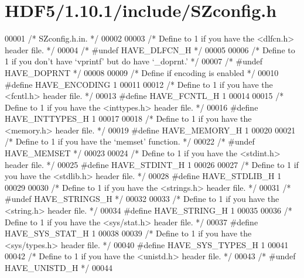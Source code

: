 \hypertarget{_h_d_f5_21_810_81_2include_2_s_zconfig_8h_source}{}\section{H\+D\+F5/1.10.1/include/\+S\+Zconfig.h}
\label{_h_d_f5_21_810_81_2include_2_s_zconfig_8h_source}

\begin{DoxyCode}
00001 \textcolor{comment}{/* SZconfig.h.in.  */}
00002 
00003 \textcolor{comment}{/* Define to 1 if you have the <dlfcn.h> header file. */}
00004 \textcolor{comment}{/* #undef HAVE\_DLFCN\_H */}
00005 
00006 \textcolor{comment}{/* Define to 1 if you don't have `vprintf' but do have `\_doprnt.' */}
00007 \textcolor{comment}{/* #undef HAVE\_DOPRNT */}
00008 
00009 \textcolor{comment}{/* Define if encoding is enabled */}
00010 \textcolor{preprocessor}{#define HAVE\_ENCODING 1}
00011 
00012 \textcolor{comment}{/* Define to 1 if you have the <fcntl.h> header file. */}
00013 \textcolor{preprocessor}{#define HAVE\_FCNTL\_H 1}
00014 
00015 \textcolor{comment}{/* Define to 1 if you have the <inttypes.h> header file. */}
00016 \textcolor{preprocessor}{#define HAVE\_INTTYPES\_H 1}
00017 
00018 \textcolor{comment}{/* Define to 1 if you have the <memory.h> header file. */}
00019 \textcolor{preprocessor}{#define HAVE\_MEMORY\_H 1}
00020 
00021 \textcolor{comment}{/* Define to 1 if you have the `memset' function. */}
00022 \textcolor{comment}{/* #undef HAVE\_MEMSET */}
00023 
00024 \textcolor{comment}{/* Define to 1 if you have the <stdint.h> header file. */}
00025 \textcolor{preprocessor}{#define HAVE\_STDINT\_H 1}
00026 
00027 \textcolor{comment}{/* Define to 1 if you have the <stdlib.h> header file. */}
00028 \textcolor{preprocessor}{#define HAVE\_STDLIB\_H 1}
00029 
00030 \textcolor{comment}{/* Define to 1 if you have the <strings.h> header file. */}
00031 \textcolor{comment}{/* #undef HAVE\_STRINGS\_H */}
00032 
00033 \textcolor{comment}{/* Define to 1 if you have the <string.h> header file. */}
00034 \textcolor{preprocessor}{#define HAVE\_STRING\_H 1}
00035 
00036 \textcolor{comment}{/* Define to 1 if you have the <sys/stat.h> header file. */}
00037 \textcolor{preprocessor}{#define HAVE\_SYS\_STAT\_H 1}
00038 
00039 \textcolor{comment}{/* Define to 1 if you have the <sys/types.h> header file. */}
00040 \textcolor{preprocessor}{#define HAVE\_SYS\_TYPES\_H 1}
00041 
00042 \textcolor{comment}{/* Define to 1 if you have the <unistd.h> header file. */}
00043 \textcolor{comment}{/* #undef HAVE\_UNISTD\_H */}
00044 

\end{DoxyCode}
